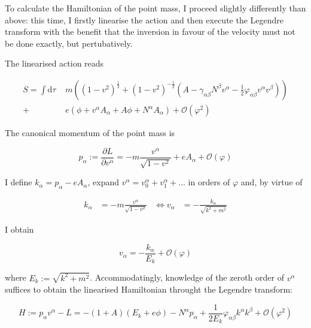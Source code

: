 \documentclass[11pt]{article}
\begin{document}
To calculate the Hamiltonian of the point mass, I proceed slightly differently than above: this time, I firstly linearise the action and then execute the Legendre transform with the benefit that the inversion in favour of the velocity must not be done exactly, but pertubatively.

The linearised action reads

\begin{equation}
\begin{split}
	S = \int \mathrm{d}\tau  \, \, 
	& m \left(
	\left( 1 - v^2 \right)^{\frac{1}{2}}
	+ \left( 1 - v^2 \right)^{- \frac{1}{2}}
	\left( A - \gamma_{\alpha \beta} N^\beta v^\alpha - \frac{1}{2} \varphi_{\alpha \beta} v^\alpha v^\beta \right)
	\right)\\
	+ \, \, & e \left( \phi + v^\alpha A_\alpha + A \phi + N^\alpha A_\alpha \right) + \mathcal{O} \left(\varphi^2 \right)
\end{split}
\end{equation}

The canonical momentum of the point mass is

\begin{equation} \label{momentum_pp_met}
	p_\alpha := \frac{ \partial L}{\partial v^\alpha}
	= -m \frac{v^\alpha}{\sqrt{1- v^2}} + e A_\alpha	 
	+ \mathcal{O} \left(\varphi \right)
\end{equation}

I define $k_\alpha = p_\alpha - e A_\alpha$, expand $v^\alpha = v^\alpha_0 + v^\alpha_1 + \dots $ in orders of $\varphi$ and, by virtue of

\begin{align}
	k_\alpha &= -m \frac{v^\alpha}{\sqrt{1- v^2}} 
	 &\Leftrightarrow 
	 v_\alpha &= - \frac{k_\alpha}{\sqrt{k^2 + m^2}} 
\end{align}

I obtain

\begin{equation} \label{veloc_pp_met}
	v_\alpha = - \frac{k_\alpha}{E_k} + \mathcal{O} \left(\varphi \right)
\end{equation}

where $E_k := \sqrt{k^2+ m^2}$. Accommodatingly, knowledge of the zeroth order of $v^\alpha$ suffices to obtain the linearised Hamiltonian throught the Legendre transform:

\begin{equation} \label{ham_pp_met}
	H := p_\alpha v^\alpha - L  
	= - \left( 1 + A \right) \left( E_k + e \phi \right)
	- N^\alpha p_\alpha + \frac{1}{2 E_k} \varphi_{\alpha \beta} k^\alpha k^\beta + \mathcal{O} \left(\varphi^2 \right)
\end{equation}
\end{document}
